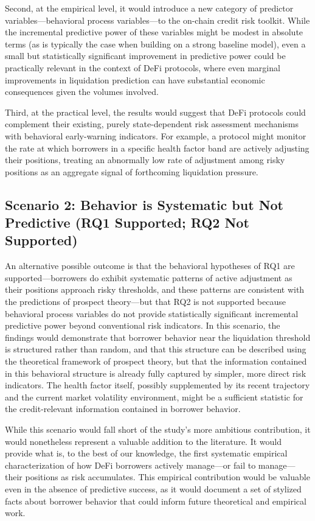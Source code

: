 Second, at the empirical level, it would introduce a new category of predictor variables—behavioral process variables—to the on-chain credit risk toolkit. While the incremental predictive power of these variables might be modest in absolute terms (as is typically the case when building on a strong baseline model), even a small but statistically significant improvement in predictive power could be practically relevant in the context of DeFi protocols, where even marginal improvements in liquidation prediction can have substantial economic consequences given the volumes involved.

Third, at the practical level, the results would suggest that DeFi protocols could complement their existing, purely state-dependent risk assessment mechanisms with behavioral early-warning indicators. For example, a protocol might monitor the rate at which borrowers in a specific health factor band are actively adjusting their positions, treating an abnormally low rate of adjustment among risky positions as an aggregate signal of forthcoming liquidation pressure.

\subsection{Scenario 2: Behavior is Systematic but Not Predictive (RQ1 Supported; RQ2 Not Supported)}

An alternative possible outcome is that the behavioral hypotheses of RQ1 are supported—borrowers do exhibit systematic patterns of active adjustment as their positions approach risky thresholds, and these patterns are consistent with the predictions of prospect theory—but that RQ2 is not supported because behavioral process variables do not provide statistically significant incremental predictive power beyond conventional risk indicators. In this scenario, the findings would demonstrate that borrower behavior near the liquidation threshold is structured rather than random, and that this structure can be described using the theoretical framework of prospect theory, but that the information contained in this behavioral structure is already fully captured by simpler, more direct risk indicators. The health factor itself, possibly supplemented by its recent trajectory and the current market volatility environment, might be a sufficient statistic for the credit-relevant information contained in borrower behavior.

While this scenario would fall short of the study's more ambitious contribution, it would nonetheless represent a valuable addition to the literature. It would provide what is, to the best of our knowledge, the first systematic empirical characterization of how DeFi borrowers actively manage—or fail to manage—their positions as risk accumulates. This empirical contribution would be valuable even in the absence of predictive success, as it would document a set of stylized facts about borrower behavior that could inform future theoretical and empirical work.

